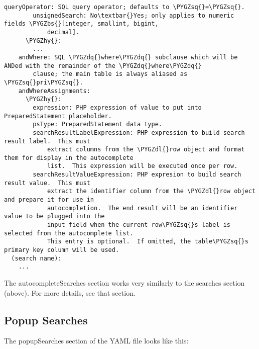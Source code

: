 \documentclass[letterpaper,10pt,english]{sphinxmanual}
\def\PYGZbs{\char`\\}
\def\PYGZdl{\char`\$}
\def\PYGZhy{\char`\-}
\def\PYGZsq{\char`\'}
\def\PYGZdq{\char`\"}
\renewcommand\PYGZsq{\textquotesingle}
\begin{document}
\begin{Verbatim}[commandchars=\\\{\}]
        queryOperator: SQL query operator; defaults to \PYGZsq{}=\PYGZsq{}.
        unsignedSearch: No\textbar{}Yes; only applies to numeric fields \PYGZbs{}[integer, smallint, bigint,
            decimal].
      \PYGZhy{}:
        ...
    andWhere: SQL \PYGZdq{}where\PYGZdq{} subclause which will be ANDed with the remainder of the \PYGZdq{}where\PYGZdq{}
        clause; the main table is always aliased as \PYGZsq{}pri\PYGZsq{}.
    andWhereAssignments:
      \PYGZhy{}:
        expression: PHP expression of value to put into PreparedStatement placeholder.
        psType: PreparedStatement data type.
        searchResultLabelExpression: PHP expression to build search result label.  This must
            extract columns from the \PYGZdl{}row object and format them for display in the autocomplete
            list.  This expression will be executed once per row.
        searchResultValueExpression: PHP expresion to build search result value.  This must
            extract the identifier column from the \PYGZdl{}row object and prepare it for use in
            autocompletion.  The end result will be an identifier value to be plugged into the
            input field when the current row\PYGZsq{}s label is selected from the autocomplete list.
            This entry is optional.  If omitted, the table\PYGZsq{}s primary key column will be used.
  (search name):
    ...
\end{Verbatim}

The autocompleteSearches section works very similarly to the searches section (above).  For more
details, see that section.


\subsection{Popup Searches}
\label{jaxFrameworkGuide:popup-searches}
The popupSearches section of the YAML file looks like this:
\end{document}
